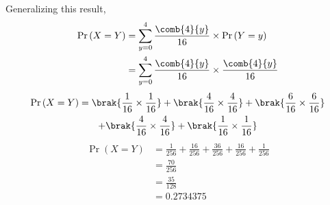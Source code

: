 Generalizing this result,
\begin{align}
    \Pr{(X=Y)} &= \sum_{y=0}^4  \frac{\comb{4}{y}}{16}\times \Pr{(Y=y)}
    \\ &= \sum_{y=0}^4 \frac{\comb{4}{y}}{16} \times \frac{\comb{4}{y}}{16}
\end{align}
\begin{multline}
    \Pr{(X=Y)} = \brak{\frac{1}{16}\times\frac{1}{16}} + \brak{\frac{4}{16}\times\frac{4}{16}} +\brak{\frac{6}{16}\times\frac{6}{16}} \\+\brak{\frac{4}{16}\times\frac{4}{16}} +\brak{\frac{1}{16}\times\frac{1}{16}} 
\end{multline}
\begin{align}
    \Pr{(X=Y)} &= \frac{1}{256} + \frac{16}{256} +\frac{36}{256} +\frac{16}{256} +\frac{1}{256} 
    \\&= \frac{70}{256} 
    \\&= \frac{35}{128} 
    \\&= 0.2734375
\end{align}